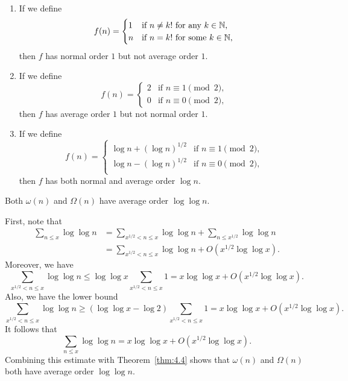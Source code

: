 \begin{exmp}\label{exmp:4.8}~
    \begin{enumerate}[(1)]
        \item If we define 
        \[ f(n) = \begin{cases} 1 & \text{if $n \neq k!$ for any $k \in \mathbb{N}$,} \\ 
            n & \text{if $n = k!$ for some $k \in \mathbb{N}$,} \end{cases} \] 
        then $f$ has normal order $1$ but not average order $1$. 
        \item If we define 
        \[ f(n) = \begin{cases} 2 & \text{if $n \equiv 1 \pmod 2$,} \\ 
            0 & \text{if $n \equiv 0 \pmod 2$,} \end{cases} \] 
        then $f$ has average order $1$ but not normal order $1$. 
        \item If we define 
        \[ f(n) = \begin{cases}
            \log n + (\log n)^{1/2} & \text{if $n \equiv 1 \pmod 2$,} \\ 
            \log n - (\log n)^{1/2} & \text{if $n \equiv 0 \pmod 2$,} \\ 
        \end{cases} \] 
        then $f$ has both normal and average order $\log n$.
    \end{enumerate}
\end{exmp}

\begin{thm}\label{thm:4.9}
    Both $\omega(n)$ and $\Omega(n)$ have average order $\log\log n$. 
\end{thm}
\begin{pf}
    First, note that 
    \begin{align*} 
        \sum_{n\leq x} \log\log n 
        &= \sum_{x^{1/2}<n\leq x} \log\log n + \sum_{n\leq x^{1/2}} \log\log n \\
        &= \sum_{x^{1/2}<n\leq x} \log\log n + O(x^{1/2}\log \log x). 
    \end{align*}
    Moreover, we have 
    \[ \sum_{x^{1/2} < n \leq x} \log\log n \leq \log\log x  
    \sum_{x^{1/2} < n \leq x} 1 = x\log\log x + O(x^{1/2}\log\log x). \] 
    Also, we have the lower bound 
    \[ \sum_{x^{1/2} < n \leq x} \log\log n \geq (\log\log x - \log 2) 
    \sum_{x^{1/2} < n \leq x} 1 = x\log\log x + O(x^{1/2}\log\log x). \] 
    It follows that 
    \[ \sum_{n\leq x} \log\log n = x\log\log x + O(x^{1/2}\log\log x). \] 
    Combining this estimate with Theorem~\ref{thm:4.4} shows that 
    $\omega(n)$ and $\Omega(n)$ both have average order $\log\log n$. 
\end{pf}

